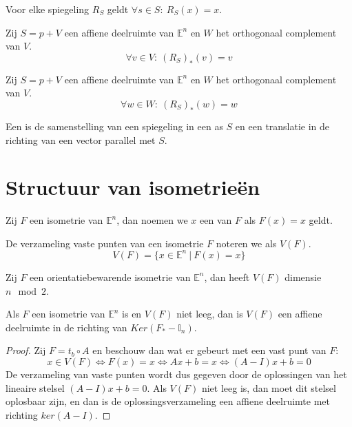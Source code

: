 \documentclass[main.tex]{subfiles}
\begin{document}
\begin{st}
  Voor elke spiegeling $R_{S}$ geldt $\forall s \in S:\ R_{S}(x) = x$.
\end{st}

\begin{lem}
  Zij $S=p+V$ een affiene deelruimte van $\mathbb{E}^{n}$ en $W$ het orthogonaal complement van $V$.
  \[ \forall v\in V:\ (R_{S})_{*}(v) = v \]
\end{lem}

\begin{lem}
  Zij $S=p+V$ een affiene deelruimte van $\mathbb{E}^{n}$ en $W$ het orthogonaal complement van $V$.
  \[ \forall w\in W:\ (R_{S})_{*}(w) = w \]
\end{lem}

\begin{de} 
  \examen
  Een  is de samenstelling van een spiegeling in een as $S$ en een translatie in de richting van een vector parallel met $S$.
\end{de}

\section{Structuur van isometrie\"en}
\label{sec:struct-van-isom}

\begin{de}
  Zij $F$ een isometrie van $\mathbb{E}^{n}$, dan noemen we $x$ een  van $F$ als $F(x)=x$ geldt.
\end{de}

\begin{de}
  De verzameling vaste punten van een isometrie $F$ noteren we als $V(F)$.
  \[ V(F) = \{ x \in \mathbb{E}^{n} \ |\ F(x) = x \} \]
\end{de}

\begin{ei}
  \examen
  Zij $F$ een orientatiebewarende isometrie van $\mathbb{E}^{n}$, dan heeft $V(F)$ dimensie $n\mod 2$.
\end{ei}

\begin{st}
  Als $F$ een isometrie van $\mathbb{E}^{n}$ is en $V(F)$ niet leeg, dan is $V(F)$ een affiene deelruimte in de richting van $Ker(F_{*}-\mathbb{I}_{n})$.

  \begin{proof}
    Zij $F=t_{b} \circ A$ en beschouw dan wat er gebeurt met een vast punt van $F$:
    \[ x\in V(F) \Leftrightarrow F(x) = x \Leftrightarrow Ax+b=x \Leftrightarrow (A-I)x+b = 0 \]
    De verzameling van vaste punten wordt dus gegeven door de oplossingen van het lineaire stelsel $(A-I)x+b=0$.
    Als $V(F)$ niet leeg is, dan moet dit stelsel oplosbaar zijn, en dan is de oplossingsverzameling een affiene deelruimte met richting $ker(A-I)$.
  \end{proof}
\end{st}
\end{document}
